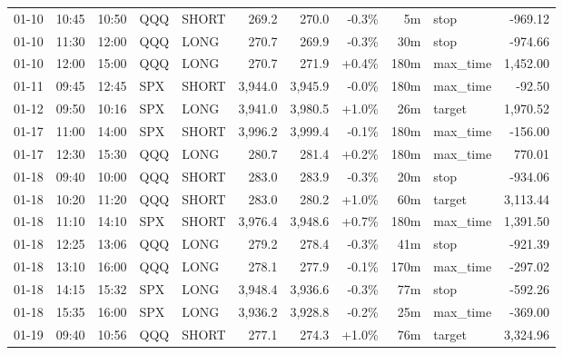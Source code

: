 \documentclass[11pt,a4paper,twoside]{article}
\begin{document}
\begin{center}
\begin{longtable}{>{\color{txtmain}}l l l l l r r r r >{\color{txtmain}}l r}
01-10 & 10:45 & 10:50 & QQQ & SHORT & 269.2 & 270.0 & \textcolor{lossred}{-0.3\%} & 5m & stop & \textcolor{lossred}{-969.12} \\
01-10 & 11:30 & 12:00 & QQQ & LONG & 270.7 & 269.9 & \textcolor{lossred}{-0.3\%} & 30m & stop & \textcolor{lossred}{-974.66} \\
01-10 & 12:00 & 15:00 & QQQ & LONG & 270.7 & 271.9 & \textcolor{wingreen}{+0.4\%} & 180m & max\_time & \textcolor{wingreen}{1,452.00} \\
01-11 & 09:45 & 12:45 & SPX & SHORT & 3,944.0 & 3,945.9 & \textcolor{lossred}{-0.0\%} & 180m & max\_time & \textcolor{lossred}{-92.50} \\
01-12 & 09:50 & 10:16 & SPX & LONG & 3,941.0 & 3,980.5 & \textcolor{wingreen}{+1.0\%} & 26m & target & \textcolor{wingreen}{1,970.52} \\
01-17 & 11:00 & 14:00 & SPX & SHORT & 3,996.2 & 3,999.4 & \textcolor{lossred}{-0.1\%} & 180m & max\_time & \textcolor{lossred}{-156.00} \\
01-17 & 12:30 & 15:30 & QQQ & LONG & 280.7 & 281.4 & \textcolor{wingreen}{+0.2\%} & 180m & max\_time & \textcolor{wingreen}{770.01} \\
01-18 & 09:40 & 10:00 & QQQ & SHORT & 283.0 & 283.9 & \textcolor{lossred}{-0.3\%} & 20m & stop & \textcolor{lossred}{-934.06} \\
01-18 & 10:20 & 11:20 & QQQ & SHORT & 283.0 & 280.2 & \textcolor{wingreen}{+1.0\%} & 60m & target & \textcolor{wingreen}{3,113.44} \\
01-18 & 11:10 & 14:10 & SPX & SHORT & 3,976.4 & 3,948.6 & \textcolor{wingreen}{+0.7\%} & 180m & max\_time & \textcolor{wingreen}{1,391.50} \\
01-18 & 12:25 & 13:06 & QQQ & LONG & 279.2 & 278.4 & \textcolor{lossred}{-0.3\%} & 41m & stop & \textcolor{lossred}{-921.39} \\
01-18 & 13:10 & 16:00 & QQQ & LONG & 278.1 & 277.9 & \textcolor{lossred}{-0.1\%} & 170m & max\_time & \textcolor{lossred}{-297.02} \\
01-18 & 14:15 & 15:32 & SPX & LONG & 3,948.4 & 3,936.6 & \textcolor{lossred}{-0.3\%} & 77m & stop & \textcolor{lossred}{-592.26} \\
01-18 & 15:35 & 16:00 & SPX & LONG & 3,936.2 & 3,928.8 & \textcolor{lossred}{-0.2\%} & 25m & max\_time & \textcolor{lossred}{-369.00} \\
01-19 & 09:40 & 10:56 & QQQ & SHORT & 277.1 & 274.3 & \textcolor{wingreen}{+1.0\%} & 76m & target & \textcolor{wingreen}{3,324.96} \\

\end{longtable}
\end{center}
\end{document}
